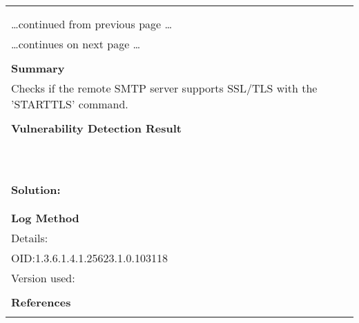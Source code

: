 \documentclass{article}
\begin{document}
\begin{longtable}{|p{}|}
\hline
\rowcolor{gvm_log}{\color{white}{Log (CVSS: 0.0) }}\\
\rowcolor{gvm_log}{\color{white}{NVT: SSL/TLS: SMTP 'STARTTLS' Command Detection}}\\
\hline
\endfirsthead
\hfill\ldots continued from previous page \ldots \\
\hline
\endhead
\hline
\ldots continues on next page \ldots \\
\endfoot
\hline
\endlastfoot
\\
\textbf{Summary}\\
Checks if the remote SMTP server supports SSL/TLS with the
  'STARTTLS' command.\\

        \hline
        \\
\textbf{Vulnerability Detection Result}\\
\rowcolor{white}{\verb=The remote SMTP server supports SSL/TLS with the 'STARTTLS' command.=}\\
\rowcolor{white}{\verb=The remote SMTP server is announcing the following available ESMTP commands (EHL=}\\
\rowcolor{white}{$\hookrightarrow$\verb=O response) before sending the 'STARTTLS' command:=}\\
\rowcolor{white}{\verb=8BITMIME, CHUNKING, DSN, ENHANCEDSTATUSCODES, ETRN, PIPELINING, SIZE 10240000, S=}\\
\rowcolor{white}{$\hookrightarrow$\verb=MTPUTF8, STARTTLS, VRFY=}\\
\rowcolor{white}{\verb=The remote SMTP server is announcing the following available ESMTP commands (EHL=}\\
\rowcolor{white}{$\hookrightarrow$\verb=O response) after sending the 'STARTTLS' command:=}\\
\rowcolor{white}{\verb=8BITMIME, CHUNKING, DSN, ENHANCEDSTATUSCODES, ETRN, PIPELINING, SIZE 10240000, S=}\\
\rowcolor{white}{$\hookrightarrow$\verb=MTPUTF8, VRFY=}\\

          \hline
          \\
\textbf{Solution:}\\
\\


        \hline
        \\
\textbf{Log Method}\\
Details:
\rowcolor{white}{\verb=SSL/TLS: SMTP 'STARTTLS' Command Detection=}\\
OID:1.3.6.1.4.1.25623.1.0.103118\\
Version used:
\rowcolor{white}{\verb=2021-11-12T09:42:39Z=}\\

      \hline
      \\
\textbf{References}\\
\rowcolor{white}{\verb=url: https://tools.ietf.org/html/rfc3207=}\\
\end{longtable}
\end{document}
